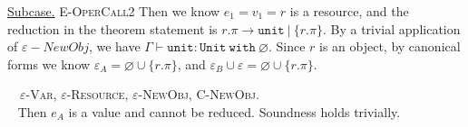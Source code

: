 \documentclass{llncs}
\newcommand{\keywadj}[1]{\mathtt{#1}}
\newcommand{\keyw}[1]{\keywadj{#1}~}
\newcommand{\kw}[1]{\keyw{ #1 }}
\newcommand{\kwa}[1]{\keywadj{ #1 }}
\newcommand{\proofcase}[2]{
	\begin{adjustwidth}{1.5em}{0pt}
		\fbox{Case.}~~#1. \\ ~#2
	\end{adjustwidth}
}
\newcommand{\subcase}[1] {
	\begin{adjustwidth}{2.2em}{0pt}
		\underline{Subcase.} #1
	\end{adjustwidth}
}
\begin{document}
{{	\subcase{\textsc{E-OperCall2} Then we know $e_1 = v_1 = r$ is a resource, and the reduction in the theorem statement is $r.\pi \longrightarrow \kwa{unit}~|~\{ r.\pi \}$. By a trivial application of $\varepsilon-NewObj$, we have $\Gamma \vdash \kwa{unit} : \kwa{Unit}~\kw{with} \varnothing$. Since $r$ is an object, by canonical forms we know $\varepsilon_A = \varnothing \cup \{ r.\pi \}$, and $\varepsilon_B \cup \varepsilon = \varnothing \cup \{ r.\pi \}$.\\
	}
}


\proofcase{\textsc{$\varepsilon$-Var}, \textsc{$\varepsilon$-Resource}, \textsc{$\varepsilon$-NewObj}, \textsc{C-NewObj}}{
	Then $e_A$ is a value and cannot be reduced. Soundness holds trivially.
}
}
\end{document}
